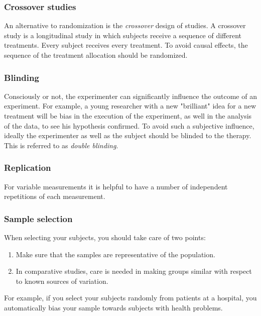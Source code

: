 \subsubsection{Crossover studies} 
An alternative to randomization is the \emph{crossover} design of studies. A crossover study is a longitudinal study in which subjects receive a sequence of different treatments. Every subject receives every treatment. To avoid causal effects, the sequence of the treatment allocation should be randomized.

\subsubsection{Blinding} 
Consciously or not, the experimenter can significantly influence the outcome of an experiment. For example, a young researcher with a new "brilliant" idea for a new treatment will be bias in the execution of the experiment, as well in the analysis of the data, to see his hypothesis confirmed. To avoid such a subjective influence, ideally the experimenter as well as the subject should be blinded to the therapy. This is referred to as \emph{double blinding}.

\subsubsection{Replication} 
For variable measurements it is helpful to have a number of independent repetitions of each measurement.

\subsubsection{Sample selection} 
When selecting your subjects, you should take care of two points:

\begin{enumerate}
  \item Make sure that the samples are representative of the population.
  \item In comparative studies, care is needed in making groups similar with respect to known sources of variation.
\end{enumerate}

For example, if you select your subjects randomly from patients at a hospital, you automatically bias your sample towards subjects with health problems.

